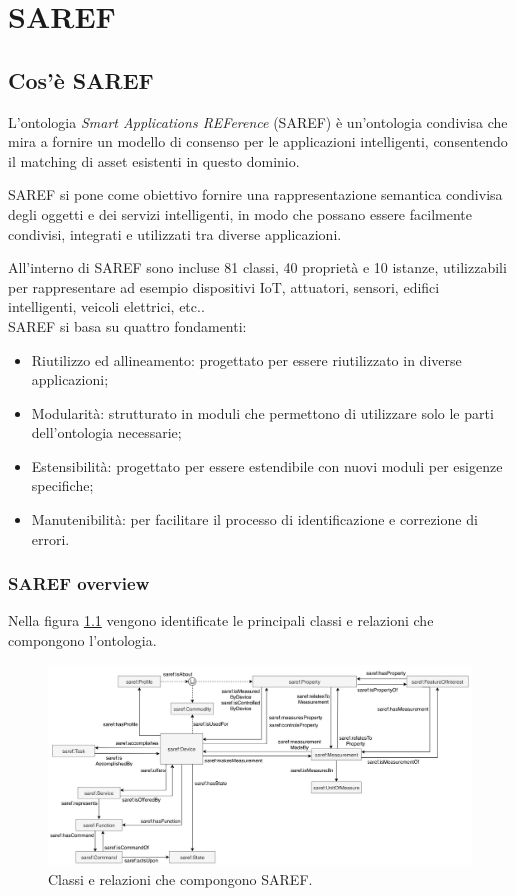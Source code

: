\chapter{SAREF}
\label{cap:panoramicaSaref}
\section{Cos'è SAREF}

L'ontologia \textit{Smart Applications REFerence} (SAREF) è un'ontologia
condivisa che mira a fornire un modello di consenso per le applicazioni
intelligenti, consentendo il matching di asset esistenti in questo dominio.

SAREF si pone come obiettivo fornire una rappresentazione semantica condivisa
degli oggetti e dei servizi intelligenti, in modo che possano essere facilmente
condivisi, integrati e utilizzati tra diverse applicazioni.

All'interno di SAREF sono incluse 81 classi, 40 proprietà e 10 istanze,
utilizzabili per rappresentare ad esempio dispositivi IoT, attuatori, sensori,
edifici intelligenti, veicoli elettrici, etc..\\

SAREF si basa su quattro fondamenti:
\begin{itemize}
      \item Riutilizzo ed allineamento: progettato per essere riutilizzato in
            diverse applicazioni;
      \item Modularità: strutturato in moduli che permettono di utilizzare solo
            le parti dell'ontologia necessarie;
      \item Estensibilità: progettato per essere estendibile con nuovi moduli
            per
            esigenze specifiche;
      \item Manutenibilità: per facilitare il processo di identificazione e
            correzione di errori.
\end{itemize}

\subsection{SAREF overview}
Nella figura \ref{fig:saref} vengono identificate le principali classi e
relazioni che compongono l'ontologia.
\begin{figure}[!ht]
      \centering
      \includegraphics[width=13cm]{figures/saref.png}
      \caption{Classi e relazioni che compongono SAREF.}
      \label{fig:saref}
\end{figure}

